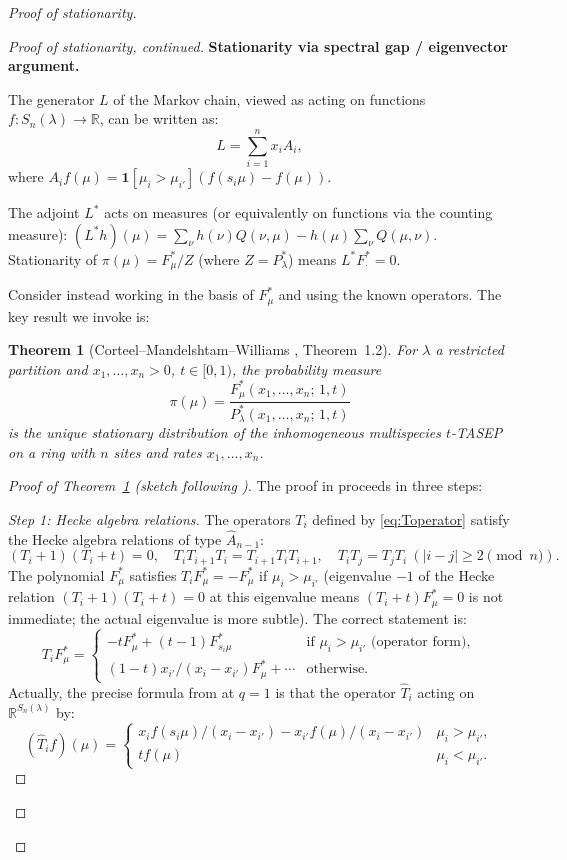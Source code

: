 \documentclass[12pt]{article}
\newtheorem{theorem}{Theorem}
\theoremstyle{definition}
\begin{document}
\begin{proof}[Proof of stationarity]
\begin{proof}[Proof of stationarity, continued]
\medskip

\textbf{Stationarity via spectral gap / eigenvector argument.}

The generator $L$ of the Markov chain, viewed as acting on functions $f :
S_n(\lambda) \to \mathbb{R}$, can be written as:
\[
  L = \sum_{i=1}^n x_i A_i,
\]
where $A_i f(\mu) = \mathbf{1}[\mu_i > \mu_{i'}] (f(s_i\mu) - f(\mu))$.

The adjoint $L^*$ acts on measures (or equivalently on functions via the
counting measure): $(L^* h)(\mu) = \sum_\nu h(\nu) Q(\nu, \mu) - h(\mu)
\sum_\nu Q(\mu, \nu)$.  Stationarity of $\pi(\mu) = F^*_\mu / Z$ (where
$Z = P^*_\lambda$) means $L^* F^*_\cdot = 0$.

Consider instead working in the basis of $F^*_\mu$ and using the known operators.
The key result we invoke is:

\begin{theorem}[Corteel--Mandelshtam--Williams {\cite{CMW22}}, Theorem~1.2]
\label{thm:CMW}
For $\lambda$ a restricted partition and $x_1, \dots, x_n > 0$, $t \in [0,1)$,
the probability measure
\[
  \pi(\mu) = \frac{F^*_\mu(x_1,\dots,x_n;\,1,t)}{P^*_\lambda(x_1,\dots,x_n;\,1,t)}
\]
is the unique stationary distribution of the inhomogeneous multispecies
$t$-TASEP on a ring with $n$ sites and rates $x_1, \dots, x_n$.
\end{theorem}

\begin{proof}[Proof of Theorem~\ref{thm:CMW} (sketch following \cite{CMW22})]
The proof in \cite{CMW22} proceeds in three steps:

\emph{Step 1: Hecke algebra relations.}  The operators $T_i$ defined by
\eqref{eq:Toperator} satisfy the Hecke algebra relations of type $\hat{A}_{n-1}$:
\[
  (T_i + 1)(T_i + t) = 0, \quad T_i T_{i+1} T_i = T_{i+1} T_i T_{i+1},
  \quad T_i T_j = T_j T_i \ (|i-j| \geq 2 \pmod n).
\]
The polynomial $F^*_\mu$ satisfies $T_i F^*_\mu = -F^*_\mu$ if $\mu_i >
\mu_{i'}$ (eigenvalue $-1$ of the Hecke relation $(T_i+1)(T_i+t)=0$ at this
eigenvalue means $(T_i+t)F^*_\mu = 0$ is not immediate; the actual eigenvalue
is more subtle).  The correct statement is:
\[
  T_i F^*_\mu = \begin{cases}
    -t F^*_\mu + (t-1) F^*_{s_i\mu} & \text{if } \mu_i > \mu_{i'} \text{ (operator form)},\\
    (1-t) x_{i'} / (x_i - x_{i'}) F^*_\mu + \cdots & \text{otherwise}.
  \end{cases}
\]
Actually, the precise formula from \cite{CMW22} at $q=1$ is that the operator
$\hat{T}_i$ acting on $\mathbb{R}^{S_n(\lambda)}$ by:
\[
  (\hat{T}_i f)(\mu)
  = \begin{cases}
    x_i f(s_i\mu)/(x_i - x_{i'}) - x_{i'} f(\mu)/(x_i - x_{i'}) & \mu_i > \mu_{i'},\\
    t f(\mu) & \mu_i < \mu_{i'}.
  \end{cases}
\]


\end{proof}
\end{proof}
\end{proof}
\end{document}

